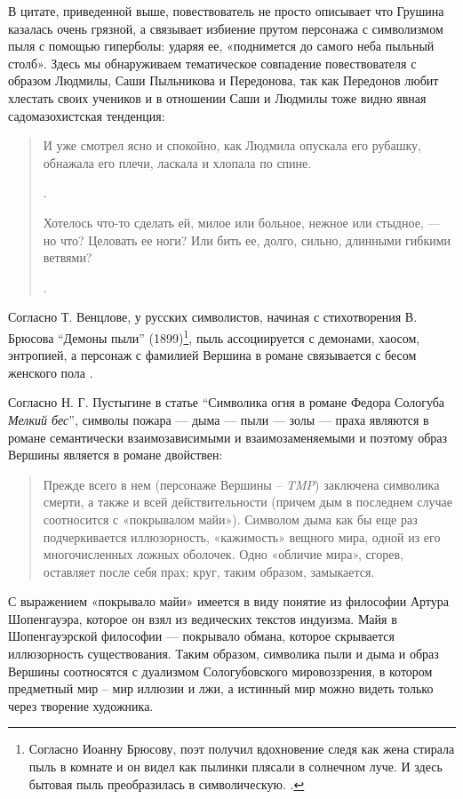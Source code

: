 \documentclass[12pt,a4paper]{article}
\begin{document}
В цитате, приведенной выше, повествователь не просто описывает что Грушина казалась очень грязной, а  связывает избиение прутом персонажа с символизмом пыля с помощью гиперболы: ударяя ее, «поднимется до самого неба пыльный столб». Здесь мы обнаруживаем тематическое совпадение повествователя с образом Людмилы, Саши Пыльникова и Передонова, так как Передонов любит хлестать своих учеников и в отношении Саши и Людмилы тоже видно явная садомазохистская тенденция:
\begin{quote}
И уже смотрел ясно и спокойно, как Людмила опускала его рубашку, обнажала его плечи, ласкала и хлопала по спине.

\parencite[208]{sologub2004}.

Хотелось что-то сделать ей, милое или больное, нежное или
стыдное, — но что? Целовать ее ноги? Или бить ее, долго, сильно, длинными гибкими ветвями?

\parencite[211]{sologub2004}.
\end{quote}

Согласно Т. Венцлове, у русских символистов, начиная с стихотворения В. Брюсова \enquote{Демоны пыли} (1899)\footnote{ Согласно Иоанну Брюсову, поэт получил вдохновение следя как жена стирала пыль в комнате и он видел как пылинки плясали в солнечном луче. И здесь бытовая пыль преобразилась в символическую. \parencite[600]{brjusov1973}.}, пыль ассоциируется с демонами, хаосом, энтропией, а персонаж с фамилией Вершина в романе связывается с бесом женского пола \parencite[42--44]{venclova2012}. 

Согласно Н. Г. Пустыгине в статье \enquote{Символика огня в романе Федора Сологуба \emph{Мелкий бес}}, символы пожара — дыма — пыли — золы — праха являются в романе семантически взаимозависимыми и взаимозаменяемыми и поэтому образ Вершины является в романе двойствен:

\begin{quote}
Прежде всего в нем (персонаже Вершины – \textit{TMP}) заключена символика смерти, а также и всей действительности (причем дым в последнем случае соотносится с «покрывалом майи»). Символом дыма как бы еще раз подчеркивается иллюзорность, «кажимость» вещного мира, одной из его многочисленных ложных оболочек. Одно «обличие мира», сгорев, оставляет после себя прах; круг, таким образом, замыкается.

\parencite[134.]{pustygina1989}

\end{quote}

С выражением «покрывало майи» имеется в виду понятие из философии Артура Шопенгауэра, которое он взял из ведических текстов индуизма. Майя в Шопенгауэрской философии — покрывало обмана, которое скрывается иллюзорность существования. Таким образом, символика пыли и дыма и образ Вершины соотносятся с дуализмом Сологубовского мировоззрения, в котором  предметный мир – мир иллюзии и лжи, а истинный мир можно видеть только через творение художника.
\end{document}
